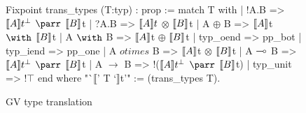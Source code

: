 \begin{figure}
\begin{coq}
Fixpoint trans_types (T:typ) : prop :=
  match T with
    | !A.B => $\llbracket A \rrbracket t^\bot$ $\parr$ $\llbracket B \rrbracket$t
    | ?A.B => $\llbracket A \rrbracket t$ $\otimes$ $\llbracket B \rrbracket$t
    | A $\oplus$ B => $\llbracket A \rrbracket$t $\with$ $\llbracket B \rrbracket$t
    | A $\with$ B => $\llbracket A \rrbracket$t $\oplus$ $\llbracket B \rrbracket$t
    | typ_oend => pp_bot
    | typ_iend => pp_one
    | A $otimes$ B => $\llbracket A \rrbracket$t $\otimes$ $\llbracket B \rrbracket$t
    | A $\multimap$ B => $\llbracket A \rrbracket t^\bot$ $\parr$ $\llbracket B \rrbracket$t
    | A $\to$ B => !($\llbracket A \rrbracket t^\bot$ $\parr$ $\llbracket B \rrbracket$t)
    | typ_unit => !$\top$
  end
where "`$\llbracket$' T `$\rrbracket$t'" := (trans_types T).
\end{coq}
\caption{GV type translation}
\label{fig:typtrans}
\end{figure}
